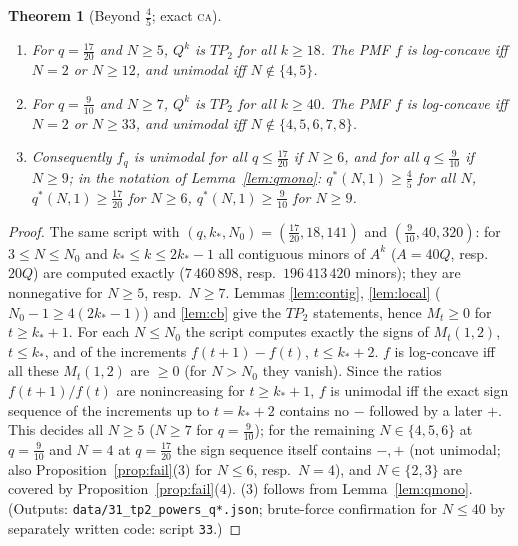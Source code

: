 \documentclass[11pt,a4paper]{article}
\newtheorem{theorem}{Theorem}[section]
\theoremstyle{definition}
\theoremstyle{remark}
\newcommand{\CA}{\textsc{ca}}
\begin{document}
\begin{theorem}[Beyond $\frac45$; exact \CA]\label{thm:tp2b}
\begin{enumerate}
\item For $q=\frac{17}{20}$ and $N\ge5$, $Q^k$ is $TP_2$ for all $k\ge18$. The PMF $f$ is log-concave iff $N=2$ or
$N\ge12$, and unimodal iff $N\notin\{4,5\}$.
\item For $q=\frac9{10}$ and $N\ge7$, $Q^k$ is $TP_2$ for all $k\ge40$. The PMF $f$ is log-concave iff $N=2$ or
$N\ge33$, and unimodal iff $N\notin\{4,5,6,7,8\}$.
\item Consequently $f_q$ is unimodal for all $q\le\frac{17}{20}$ if $N\ge6$, and for all $q\le\frac9{10}$ if $N\ge9$; in
the notation of Lemma~\ref{lem:qmono}: $q^*(N,1)\ge\frac45$ for all $N$, $q^*(N,1)\ge\frac{17}{20}$ for $N\ge6$,
$q^*(N,1)\ge\frac9{10}$ for $N\ge9$.
\end{enumerate}
\end{theorem}
\begin{proof}
The same script with $(q,k_*,N_0)=(\frac{17}{20},18,141)$ and $(\frac9{10},40,320)$: for $3\le N\le N_0$ and
$k_*\le k\le2k_*-1$ all contiguous minors of $A^k$ ($A=40Q$, resp.\ $20Q$) are computed exactly
($7\,460\,898$, resp.\ $196\,413\,420$ minors); they are nonnegative for $N\ge5$, resp.\ $N\ge7$. Lemmas
\ref{lem:contig}, \ref{lem:local} ($N_0-1\ge4(2k_*-1)$) and \ref{lem:cb} give the $TP_2$ statements, hence $M_t\ge0$ for
$t\ge k_*+1$. For each $N\le N_0$ the script computes exactly the signs of $M_t(1,2)$, $t\le k_*$, and of the
increments $f(t+1)-f(t)$, $t\le k_*+2$. $f$ is log-concave iff all these $M_t(1,2)$ are $\ge0$ (for $N>N_0$ they vanish).
Since the ratios $f(t+1)/f(t)$ are nonincreasing for $t\ge k_*+1$, $f$ is unimodal iff the exact sign sequence of the
increments up to $t=k_*+2$ contains no $-$ followed by a later $+$. This decides all $N\ge5$ ($N\ge7$ for
$q=\frac9{10}$); for the remaining $N\in\{4,5,6\}$ at $q=\frac9{10}$ and $N=4$ at $q=\frac{17}{20}$ the sign sequence itself
contains $-,+$ (not unimodal; also Proposition~\ref{prop:fail}(3) for $N\le6$, resp.\ $N=4$), and $N\in\{2,3\}$ are covered
by Proposition~\ref{prop:fail}(4). (3) follows from Lemma~\ref{lem:qmono}.
(Outputs: \texttt{data/31\_tp2\_powers\_q*.json}; brute-force confirmation for $N\le40$ by separately written code: script \texttt{33}.)
\end{proof}
\end{document}

